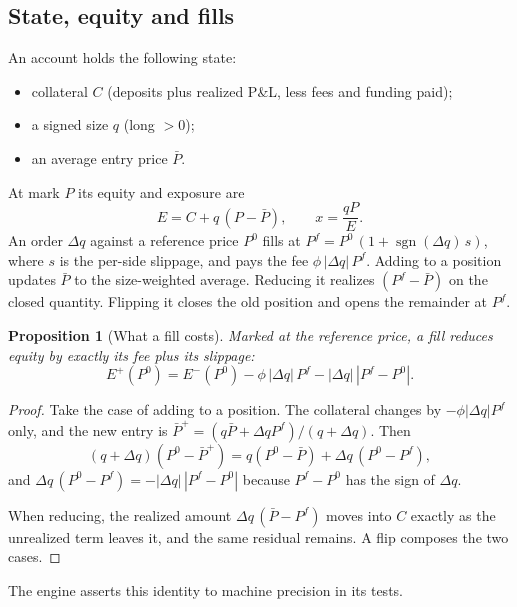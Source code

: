 \documentclass[11pt]{article}
\newtheorem{proposition}{Proposition}
\theoremstyle{remark}
\newcommand{\sgn}{\operatorname{sgn}}
\begin{document}
\subsection{State, equity and fills}
An account holds the following state:
\begin{itemize}
\item collateral $C$ (deposits plus realized P\&L, less fees and funding paid);
\item a signed size $q$ (long $>0$);
\item an average entry price $\bar P$.
\end{itemize}
At mark $P$ its equity and exposure are
\begin{equation}
E = C + q\,(P-\bar P),\qquad x = \frac{qP}{E}.
\end{equation}
An order $\Delta q$ against a reference price $P^0$ fills at $P^f = P^0\,(1+\sgn(\Delta q)\,s)$, where $s$ is the per-side slippage, and pays the fee $\phi\,|\Delta q|\,P^f$. Adding to a position updates $\bar P$ to the size-weighted average. Reducing it realizes $(P^f-\bar P)$ on the closed quantity. Flipping it closes the old position and opens the remainder at $P^f$.

\begin{proposition}[What a fill costs]\label{prop:fill}
Marked at the reference price, a fill reduces equity by exactly its fee plus its slippage:
\[
E^{+}(P^0) = E^{-}(P^0) - \phi\,|\Delta q|\,P^f - |\Delta q|\,|P^f-P^0|.
\]
\end{proposition}
\begin{proof}
Take the case of adding to a position. The collateral changes by $-\phi|\Delta q|P^f$ only, and the new entry is $\bar P^{+} = (q\bar P + \Delta q P^f)/(q+\Delta q)$. Then
\[
(q+\Delta q)(P^0-\bar P^{+}) = q(P^0-\bar P) + \Delta q\,(P^0 - P^f),
\]
and $\Delta q\,(P^0-P^f) = -|\Delta q|\,|P^f-P^0|$ because $P^f-P^0$ has the sign of $\Delta q$.

When reducing, the realized amount $\Delta q\,(\bar P - P^f)$ moves into $C$ exactly as the unrealized term leaves it, and the same residual remains. A flip composes the two cases.
\end{proof}
The engine asserts this identity to machine precision in its tests.
\end{document}
